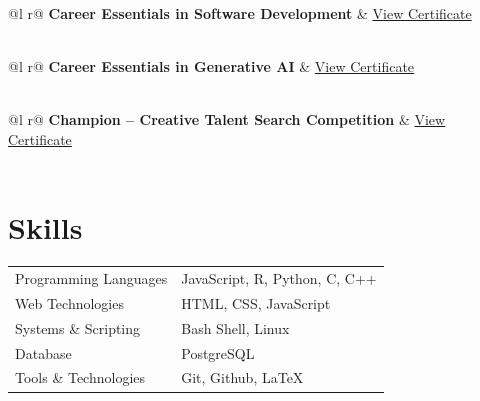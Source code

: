 \documentclass[a4paper,12pt]{article}
\begin{document}
\begin{tabularx}{\linewidth}{ @{}l r@{} }
    \textbf{Career Essentials in Software Development} & \hfill \href{https://www.linkedin.com/learning/certificates/b47ab2e721fb8ba120d27288096edeca25ef7cfba7b85efdbd84445d1ec05b55}{View Certificate} \\[3.75pt]
                                                                                                                                                \\
\end{tabularx}

\begin{tabularx}{\linewidth}{ @{}l r@{} }
    \textbf{Career Essentials in Generative AI} & \hfill \href{https://www.linkedin.com/learning/certificates/6f72b0e48a5817dc558db49ca0673a70bb89d664f12973b92fb28f3bbaa996db}{View Certificate} \\[3.75pt]
                                                                                                                                         \\
\end{tabularx}

\begin{tabularx}{\linewidth}{ @{}l r@{} }
    \textbf{Champion – Creative Talent Search Competition} & \hfill \href{https://drive.google.com/file/d/1m3npleUNXnW2Rd6uJq2z2-FtGwx6_NgP/view?usp=sharing}{View Certificate} \\[3.75pt]
                                                                            \\
\end{tabularx}

\section{Skills}
\begin{tabularx}{\linewidth}{@{}l X@{}}

    Programming Languages & \normalsize{JavaScript, R, Python, C, C++} \\

    Web Technologies      & \normalsize{HTML, CSS, JavaScript}         \\

    Systems \& Scripting  & \normalsize{Bash Shell, Linux}             \\

    Database              & \normalsize{PostgreSQL}                    \\

    Tools \& Technologies & \normalsize{Git, Github, LaTeX}            \\
\end{tabularx}

\vfill
{}
\end{document}
